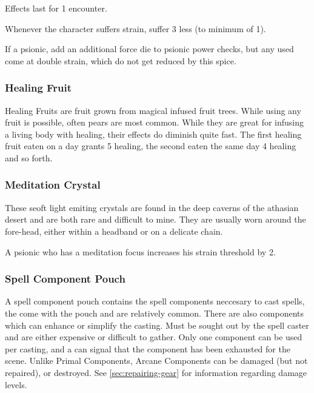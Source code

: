 \begin{multicols}{2}
Effects last for 1 encounter.

Whenever the character suffers strain, suffer 3 less (to
minimum of 1).

If a psionic, add an additional force die to psionic power checks,
but any \dark used come at double strain, which do not get reduced
by this spice.

\subsubsection{Healing Fruit} \label{itmmgc:healingfruit}
Healing Fruits are fruit grown from magical infused fruit trees.
While using any fruit is possible, often pears are most common.
While they are great for infusing a living body with healing,
their effects do diminish quite fast. The first healing fruit
eaten on a day grants 5 healing, the second eaten the same day
4 healing and so forth.

\subsubsection{Meditation Crystal} \label{itmmgc:meditation-crystal}
These seoft light emiting crystals are found in the deep caverns of
the athasian desert and are both rare and difficult to mine. They
are usually worn around the fore-head, either within a headband or
on a delicate chain.

A psionic who has a meditation focus increases his strain threshold by 2.

\subsubsection{Spell Component Pouch}
\label{itmmgc:spellcomponentpouch}
A spell component pouch contains the spell components neccesary to cast spells, the
come with the pouch and are relatively common. There are also components which can
enhance or simplify the casting. Must be sought out by the spell caster and are either
expensive or difficult to gather. Only one component can be used per casting, and a
\despair can signal that the component has been exhausted for the scene. Unlike Primal
Components, Arcane Components can be damaged (but not repaired), or destroyed. See
\cref{sec:repairing-gear} for information regarding damage levels.


\end{multicols}
